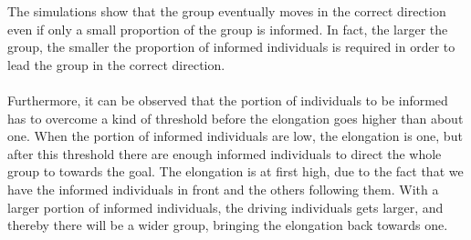 The simulations show that the group eventually moves in the correct direction even if only a small proportion of the group is informed. 
In fact, the larger the group, the smaller the proportion of informed individuals is required in order to lead the group in the correct direction.
\\\\
Furthermore, it can be observed that the portion of individuals to be informed has to overcome a kind of threshold before the elongation goes higher than about one. 
When the portion of informed individuals are low, the elongation is one, but after this threshold there are enough informed individuals to direct the whole group to towards the goal. 
The elongation is at first high, due to the fact that we have the informed individuals in front and the others following them. 
With a larger portion of informed individuals, the driving individuals gets larger, and thereby there will be a wider group, bringing the elongation back towards one.